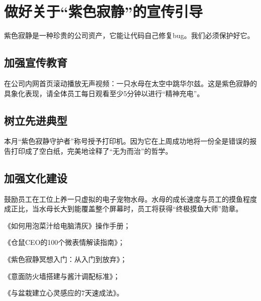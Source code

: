 \documentclass{common-doc}
\begin{document}
\section{做好关于“紫色寂静”的宣传引导}
紫色寂静是一种珍贵的公司资产，它能让代码自己修复bug。我们必须保护好它。

\subsection{加强宣传教育}
在公司内网首页滚动播放无声视频：一只水母在太空中跳华尔兹。这是紫色寂静的具象化表现，请全体员工每日观看至少5分钟以进行“精神充电”。

\subsection{树立先进典型}
本月“紫色寂静守护者”称号授予打印机。因为它在上周成功地将一份全是错误的报告打印成了空白纸，完美地诠释了“无为而治”的哲学。

\subsection{加强文化建设}
鼓励员工在工位上养一只虚拟的电子宠物水母。水母的成长速度与员工的摸鱼程度成正比，当水母长大到能覆盖整个屏幕时，员工将获得“终极摸鱼大师”勋章。

\begin{附件}
\item 《如何用泡菜汁给电脑清灰》操作手册；
\item 《仓鼠CEO的100个微表情解读指南》；
\item 《紫色寂静冥想入门：从入门到放弃》；
\item 《意面防火墙搭建与酱汁调配标准》；
\item 《与盆栽建立心灵感应的7天速成法》。
\end{附件}
\end{document}
